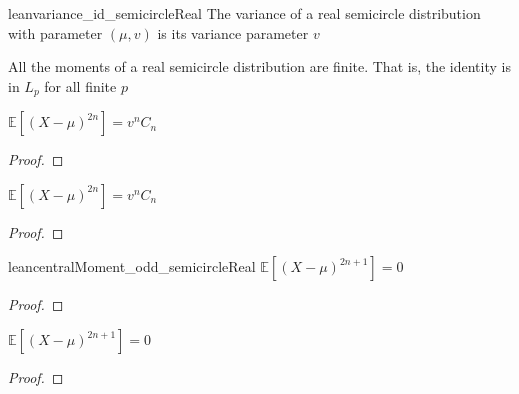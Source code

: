 \begin{lemma}\label{lem:variance_id_semicircleReal}
  lean{variance_id_semicircleReal}
  \mathlibok
  The variance of a real semicircle distribution with parameter $(\mu, v)$ is
  its variance parameter $v$
\end{lemma}


\begin{lemma}\label{lem:memLp_id_semicircleReal'}
  \mathlibok
  All the moments of a real semicircle distribution are finite. That is, the identity is in $L_p$ for
  all finite $p$
\end{lemma}

\begin{lemma}\label{lem:centralMoment_two_mul_semicircleReal}
  \notready
   $\mathbb{E}[(X  - \mu)^{2n}] = v^n C_n $
   \begin{proof}
   \end{proof}
\end{lemma}

\begin{lemma}\label{lem:centralMoment_fun_two_mul_semicircleReal}
  \notready
   $\mathbb{E}[(X  - \mu)^{2n}] = v^n C_n $
   \begin{proof}
   \end{proof}
\end{lemma}

\begin{lemma}\label{lem:centralMoment_odd_semicircleReal}
  lean{centralMoment_odd_semicircleReal}
  \notready
  $\mathbb{E}[(X  - \mu)^{2n + 1}] = 0 $
  \begin{proof}
   \end{proof}
\end{lemma}

\begin{lemma}\label{lem:centralMoment_fun_odd_semicircleReal}
  \notready
   $\mathbb{E}[(X  - \mu)^{2n + 1}] = 0 $
   \begin{proof}
   \end{proof}
\end{lemma}

